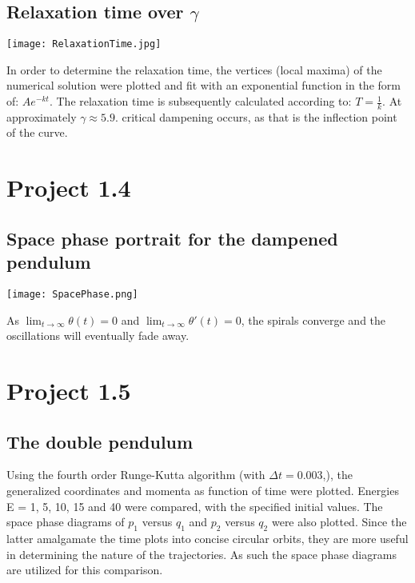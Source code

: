\documentclass[12pt]{article}
\begin{document}
\subsection*{Relaxation time over $\gamma$}
\begin{figure*}[ht!]
\begin{center}
    \texttt{[image: RelaxationTime.jpg]}
 \caption{}
\end{center}
\end{figure*}
\noindent In order to determine the relaxation time, the vertices (local maxima) of the numerical solution were plotted and fit with an exponential function in the form of: $Ae^{-kt}$. The relaxation time is subsequently calculated according to: $ T = \frac{1}{k}$. At approximately $\gamma \approx 5.9$. critical dampening occurs, as that is the inflection point of the curve.

\newpage
\section*{Project 1.4}
\subsection*{Space phase portrait for the dampened pendulum}
\begin{figure*}[ht!]
\begin{center}
    \texttt{[image: SpacePhase.png]}
 \caption{}
\end{center}
\end{figure*}
\noindent As ${\lim_{t \to \infty}}\theta(t) = 0$ and 
${\lim_{t \to \infty}}\theta'(t) = 0$, the spirals converge and the oscillations will eventually fade away. 
\newpage
\section*{Project 1.5}
\subsection*{The double pendulum}
Using the fourth order Runge-Kutta algorithm (with $\Delta t = 0.003$,), the generalized coordinates and momenta as function of time were plotted. Energies E = 1, 5, 10, 15 and 40 were compared, with the specified initial values. The space phase diagrams of $p_1$ versus $q_1$ and $p_2$ versus $q_2$ were also plotted. Since the latter amalgamate the time plots into concise circular orbits, they are more useful in determining the nature of the trajectories. As such the space phase diagrams are utilized for this comparison.
\end{document}
